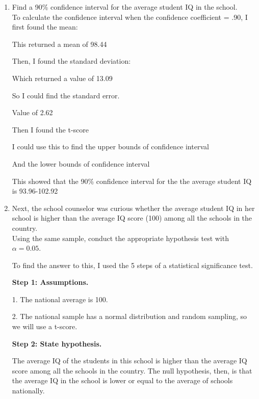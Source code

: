 \documentclass[12pt,letterpaper]{article}
\begin{document}
\begin{enumerate}
	\item Find a 90\% confidence interval for the average student IQ in the school.\\
	
		To calculate the confidence interval when the confidence coefficient = .90, I first found the mean:
		
		  
		
		This returned a mean of 98.44
		
		Then, I found the standard deviation:
		
		
		Which returned a value of 13.09
		
		So I could find the standard error.
		 
		Value of 2.62 
		
		Then I found the t-score
 		  
		
		I could use this to find the upper bounds of confidence interval
		  
		
		And the lower bounds of confidence interval
		 
		 
		This showed that the 90\% confidence interval for the the average student IQ is 
		93.96-102.92
	
	\item Next, the school counselor was curious  whether  the average student IQ in her school is higher than the average IQ score (100) among all the schools in the country.\\ 
	
	\noindent Using the same sample, conduct the appropriate hypothesis test with $\alpha=0.05$.
	
		To find the answer to this, I used the 5 steps of a statistical significance test.
		
		\textbf{Step 1: Assumptions.}
		
		1. The national average is 100.
		 
		2. The national sample has a normal distribution and random sampling, so we will use a t-score.
		
		\textbf{Step 2: State hypothesis.}
		
		The average IQ of the students in this school is higher than the average IQ score among all the schools in the country. The null hypothesis, then, is that the average IQ in the school is lower or equal to the average of schools nationally.
		

\end{enumerate}
\end{document}
